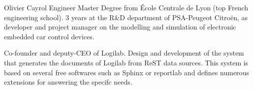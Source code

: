 \begin{participant}{Olivier Cayrol}
Engineer Master Degree from École Centrale de Lyon (top French
engineering school). 3 years at the R&D department of PSA-Peugeot
Citroën, as developer and project manager on the modelling and
simulation of electronic embedded car control devices.

Co-founder and deputy-CEO of Logilab. Design and development of the
system that generates the documents of Logilab from ReST data
sources. This system is based on several free softwares such as Sphinx
or reportlab and defines numerous extensions for answering the specifc
needs.
\end{participant}
